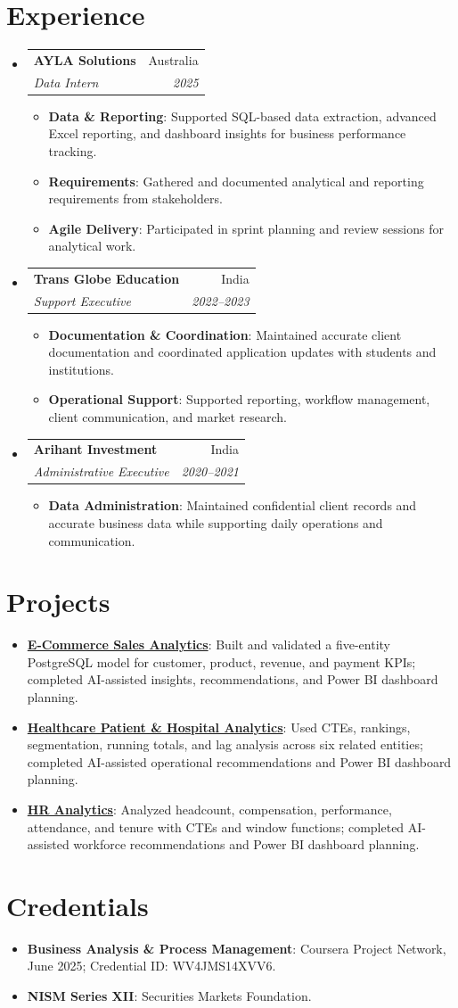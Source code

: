 \documentclass[letterpaper,11pt]{article}
\makeatletter
\newcommand{\resumeItem}[2]{
  \item\small{\textbf{#1}: #2\vspace{-2pt}}
}
\newcommand{\resumeSubheading}[4]{
  \vspace{-1pt}\item
  \begin{tabular*}{0.97\textwidth}{l@{\extracolsep{\fill}}r}
    \textbf{#1} & #2 \\
    \textit{\small #3} & \textit{\small #4} \\
  \end{tabular*}\vspace{-5pt}
}
\newcommand{\resumeProject}[2]{
  \item\small{\textbf{#1}: #2\vspace{-2pt}}
}
\newcommand{\resumeSubHeadingListStart}{\begin{itemize}[leftmargin=*]}
\newcommand{\resumeSubHeadingListEnd}{\end{itemize}}
\newcommand{\resumeItemListStart}{\begin{itemize}[leftmargin=1.2em]}
\newcommand{\resumeItemListEnd}{\end{itemize}\vspace{-5pt}}
\makeatother
\begin{document}
\section{Experience}
\resumeSubHeadingListStart
  \resumeSubheading
    {AYLA Solutions}{Australia}
    {Data Intern}{2025}
    \resumeItemListStart
      \resumeItem{Data \& Reporting}{Supported SQL-based data extraction, advanced Excel reporting, and dashboard insights for business performance tracking.}
      \resumeItem{Requirements}{Gathered and documented analytical and reporting requirements from stakeholders.}
      \resumeItem{Agile Delivery}{Participated in sprint planning and review sessions for analytical work.}
    \resumeItemListEnd
  \resumeSubheading
    {Trans Globe Education}{India}
    {Support Executive}{2022--2023}
    \resumeItemListStart
      \resumeItem{Documentation \& Coordination}{Maintained accurate client documentation and coordinated application updates with students and institutions.}
      \resumeItem{Operational Support}{Supported reporting, workflow management, client communication, and market research.}
    \resumeItemListEnd
  \resumeSubheading
    {Arihant Investment}{India}
    {Administrative Executive}{2020--2021}
    \resumeItemListStart
      \resumeItem{Data Administration}{Maintained confidential client records and accurate business data while supporting daily operations and communication.}
    \resumeItemListEnd
\resumeSubHeadingListEnd

\section{Projects}
\resumeSubHeadingListStart
  \resumeProject{\href{https://github.com/jainalimehta/Ecommerce-Sales-Analytics}{E-Commerce Sales Analytics}}{Built and validated a five-entity PostgreSQL model for customer, product, revenue, and payment KPIs; completed AI-assisted insights, recommendations, and Power BI dashboard planning.}
  \resumeProject{\href{https://github.com/jainalimehta/Healthcare-Analytics}{Healthcare Patient \& Hospital Analytics}}{Used CTEs, rankings, segmentation, running totals, and lag analysis across six related entities; completed AI-assisted operational recommendations and Power BI dashboard planning.}
  \resumeProject{\href{https://github.com/jainalimehta/HR-Analytics}{HR Analytics}}{Analyzed headcount, compensation, performance, attendance, and tenure with CTEs and window functions; completed AI-assisted workforce recommendations and Power BI dashboard planning.}
\resumeSubHeadingListEnd

\section{Credentials}
\resumeSubHeadingListStart
  \resumeProject{Business Analysis \& Process Management}{Coursera Project Network, June 2025; Credential ID: WV4JMS14XVV6.}
  \resumeProject{NISM Series XII}{Securities Markets Foundation.}
\resumeSubHeadingListEnd
\end{document}
